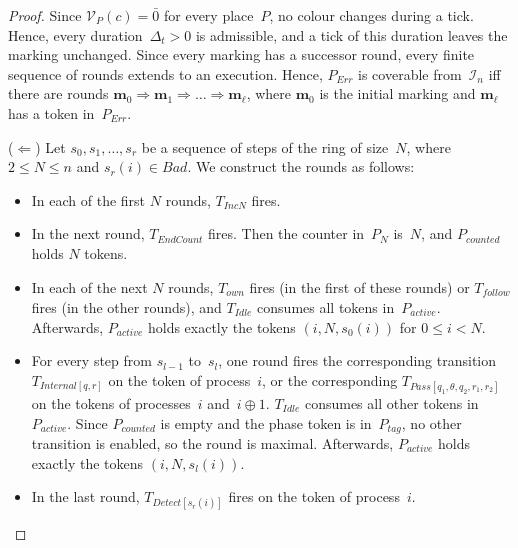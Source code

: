 \documentclass[11pt]{article}
\theoremstyle{definition}
\newcommand{\bfm}{\mathbf{m}}
\begin{document}
\begin{proof}
  Since $\mathcal{V}_P(c) = \bar{0}$ for every place~$P$, no colour changes
  during a tick. Hence, every duration~$\Delta_t > 0$ is admissible, and a
  tick of this duration leaves the marking unchanged. Since every
  marking has a successor round, every finite sequence of rounds extends to
  an execution. Hence, $P_{\mathit{Err}}$ is coverable from~$\mathcal{I}_n$
  iff there are rounds $\bfm_0 \Rightarrow \bfm_1 \Rightarrow \dots
  \Rightarrow \bfm_\ell$, where $\bfm_0$ is the initial marking and
  $\bfm_\ell$ has a token in~$P_{\mathit{Err}}$.

  ($\Leftarrow$) Let $s_0, s_1, \dots, s_r$ be a sequence of steps of the
  ring of size~$N$, where $2 \le N \le n$ and $s_r(i) \in \mathit{Bad}$. We
  construct the rounds as follows:
  \begin{itemize}
    \item In each of the first $N$ rounds, $T_{\mathit{IncN}}$ fires.
    \item In the next round, $T_{\mathit{EndCount}}$ fires. Then the counter
      in~$P_N$ is~$N$, and $P_{\mathit{counted}}$ holds $N$ tokens.
    \item In each of the next $N$ rounds, $T_{\mathit{own}}$ fires (in the
      first of these rounds) or $T_{\mathit{follow}}$ fires (in the other
      rounds), and $T_{\mathit{Idle}}$ consumes all tokens
      in~$P_{\mathit{active}}$. Afterwards, $P_{\mathit{active}}$ holds
      exactly the tokens $(i, N, s_0(i))$ for $0 \le i < N$.
    \item For every step from $s_{l-1}$ to~$s_l$, one round fires the
      corresponding transition $T_{\mathit{Internal}[q, r]}$ on the token of
      process~$i$, or the corresponding
      $T_{\mathit{Pass}[q_1, \theta, q_2, r_1, r_2]}$ on the tokens of
      processes~$i$ and~$i \oplus 1$. $T_{\mathit{Idle}}$ consumes all other
      tokens in~$P_{\mathit{active}}$. Since $P_{\mathit{counted}}$ is empty and the phase
      token is in~$P_{\mathit{tag}}$, no other transition is enabled, so the
      round is maximal. Afterwards, $P_{\mathit{active}}$ holds exactly the
      tokens $(i, N, s_l(i))$.
    \item In the last round, $T_{\mathit{Detect}[s_r(i)]}$ fires on the
      token of process~$i$.
  \end{itemize}


\end{proof}
\end{document}
